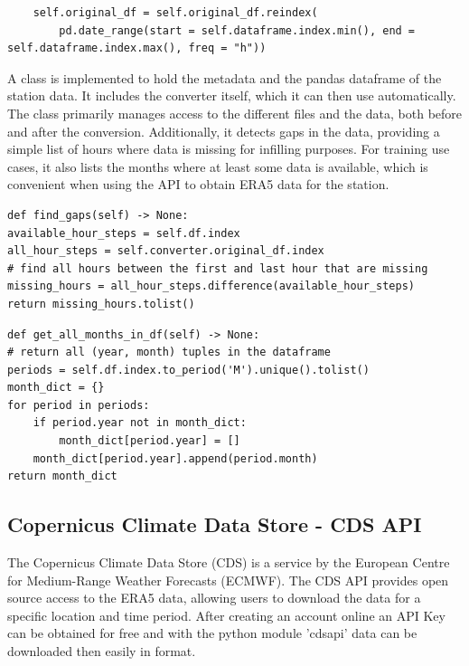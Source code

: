 \begin{lstlisting}
    self.original_df = self.original_df.reindex(
        pd.date_range(start = self.dataframe.index.min(), end = self.dataframe.index.max(), freq = "h"))
\end{lstlisting}

A class  is implemented to hold the metadata and the pandas dataframe of the station data.
It includes the converter itself, which it can then use automatically.
The class primarily manages access to the different files and the data, both before and after the conversion.
Additionally, it detects gaps in the data, providing a simple list of hours where data is missing for infilling purposes.
For training use cases, it also lists the months where at least some data is available, which is convenient when using the API to obtain ERA5 data for the station.

\begin{lstlisting}[caption=Gap Detection in Station Class, label=lst: find_gaps]
def find_gaps(self) -> None:
available_hour_steps = self.df.index
all_hour_steps = self.converter.original_df.index
# find all hours between the first and last hour that are missing
missing_hours = all_hour_steps.difference(available_hour_steps)
return missing_hours.tolist()
\end{lstlisting}

\begin{lstlisting}[caption=Detection of available ranges in Station Class, label=lst: available_ranges]
def get_all_months_in_df(self) -> None:
# return all (year, month) tuples in the dataframe
periods = self.df.index.to_period('M').unique().tolist()
month_dict = {}
for period in periods:
    if period.year not in month_dict:
        month_dict[period.year] = []
    month_dict[period.year].append(period.month)
return month_dict
\end{lstlisting}

\subsection{Copernicus Climate Data Store - CDS API}
\label{sec: cds_api}

The Copernicus Climate Data Store (CDS) is a service by the European Centre for Medium-Range Weather Forecasts (ECMWF).
The CDS API provides open source access to the ERA5 data, allowing users to download the data for a specific location and time period.
After creating an account online an API Key can be obtained for free and with the python module 'cdsapi' data can be downloaded then easily in  format. 

